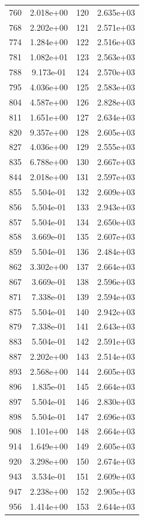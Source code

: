 \documentclass[12pt]{article}
\begin{document}
\begin{longtable}{@{}cccc@{}}
760 & 2.018e+00 & 120 & 2.635e+03 \\
768 & 2.202e+00 & 121 & 2.571e+03 \\
774 & 1.284e+00 & 122 & 2.516e+03 \\
781 & 1.082e+01 & 123 & 2.563e+03 \\
788 & 9.173e-01 & 124 & 2.570e+03 \\
795 & 4.036e+00 & 125 & 2.583e+03 \\
804 & 4.587e+00 & 126 & 2.828e+03 \\
811 & 1.651e+00 & 127 & 2.634e+03 \\
820 & 9.357e+00 & 128 & 2.605e+03 \\
827 & 4.036e+00 & 129 & 2.555e+03 \\
835 & 6.788e+00 & 130 & 2.667e+03 \\
844 & 2.018e+00 & 131 & 2.597e+03 \\
855 & 5.504e-01 & 132 & 2.609e+03 \\
856 & 5.504e-01 & 133 & 2.943e+03 \\
857 & 5.504e-01 & 134 & 2.650e+03 \\
858 & 3.669e-01 & 135 & 2.607e+03 \\
859 & 5.504e-01 & 136 & 2.484e+03 \\
862 & 3.302e+00 & 137 & 2.664e+03 \\
867 & 3.669e-01 & 138 & 2.596e+03 \\
871 & 7.338e-01 & 139 & 2.594e+03 \\
875 & 5.504e-01 & 140 & 2.942e+03 \\
879 & 7.338e-01 & 141 & 2.643e+03 \\
883 & 5.504e-01 & 142 & 2.591e+03 \\
887 & 2.202e+00 & 143 & 2.514e+03 \\
893 & 2.568e+00 & 144 & 2.605e+03 \\
896 & 1.835e-01 & 145 & 2.664e+03 \\
897 & 5.504e-01 & 146 & 2.830e+03 \\
898 & 5.504e-01 & 147 & 2.696e+03 \\
908 & 1.101e+00 & 148 & 2.664e+03 \\
914 & 1.649e+00 & 149 & 2.605e+03 \\
920 & 3.298e+00 & 150 & 2.674e+03 \\
943 & 3.534e-01 & 151 & 2.609e+03 \\
947 & 2.238e+00 & 152 & 2.905e+03 \\
956 & 1.414e+00 & 153 & 2.644e+03 \\

\end{longtable}
\end{document}
